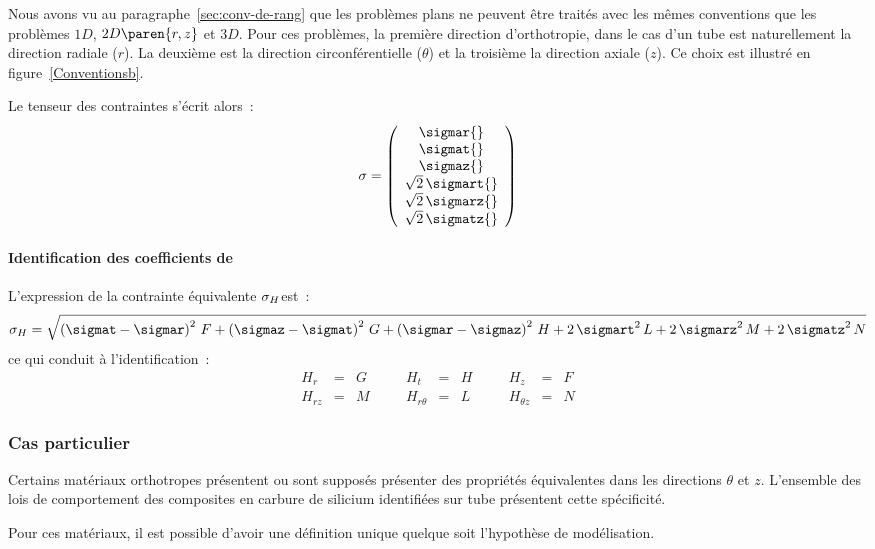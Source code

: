 Nous avons vu au paragraphe~\ref{sec:conv-de-rang} que les problèmes
plans ne peuvent être traités avec les mêmes conventions que les
problèmes \(1D\), \(2D\paren{r,z}\) et \(3D\). Pour ces problèmes, la
première direction d'orthotropie, dans le cas d'un tube est
naturellement la direction radiale (\(r\)). La deuxième est la
direction circonférentielle (\(\theta\)) et la troisième la direction
axiale (\(z\)). Ce choix est illustré en figure~\ref{Conventionsb}.

Le tenseur des contraintes s'écrit alors~:
\begin{equation}
  \label{eq:tsigma_tube2}
  \sigma = \left(
    \begin{array}{c}
      \sigmar{} \\
      \sigmat{}  \\
      \sigmaz{}  \\
      \sqrt{2}\,\sigmart{} \\
      \sqrt{2}\,\sigmarz{} \\
      \sqrt{2}\,\sigmatz{} \\
    \end{array}
  \right)
\end{equation}

\paragraph{Identification des coefficients de } L'expression
de la contrainte équivalente \(\sigma_{H}\)est~:
\begin{equation}
  \label{eq:sigH2} \sigmaH = \sqrt{\left(\sigmat-\sigmar\right)^2\,F +
    \left(\sigmaz-\sigmat\right)^2\,G +
    \left(\sigmar-\sigmaz\right)^2\,H + 2\,\sigmart^2\,L +
    2\,\sigmarz^2\,M + 2\,\sigmatz^2\,N}
\end{equation}
ce qui conduit à l'identification~:
\[
\begin{aligned} H_{r} &= & G & \quad &H_{t} &= & H & \quad &H_{z} &= & F
  \\
  H_{rz} &= & M & \quad &H_{r\theta} &= & L & \quad &H_{\theta z} &= & N
\end{aligned}
\]

\subsubsection{Cas particulier}

Certains matériaux orthotropes présentent ou sont supposés présenter des
propriétés équivalentes dans les directions \(\theta\) et \(z\).
L'ensemble des lois de comportement des composites en carbure de
silicium identifiées sur tube présentent cette spécificité.

Pour ces matériaux, il est possible d'avoir une définition unique
quelque soit l'hypothèse de modélisation.